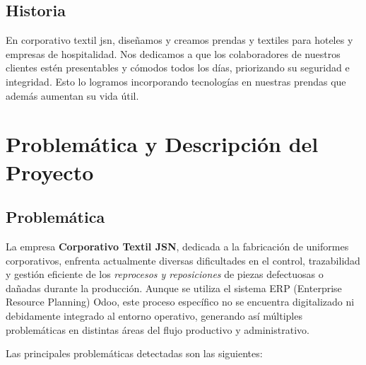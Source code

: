 \documentclass[12pt,letterpaper,spanish]{report}
\begin{document}
\section{Historia}
En corporativo textil jsn, diseñamos y creamos prendas y textiles para hoteles y empresas de hospitalidad.
Nos dedicamos a que los colaboradores de nuestros clientes estén presentables y cómodos todos los días, priorizando su seguridad e integridad.
Esto lo logramos incorporando tecnologías en nuestras prendas que además aumentan su vida útil.


\newpage




\chapter{Problemática y Descripción del Proyecto}
\newpage

\section{Problemática}

La empresa \textbf{Corporativo Textil JSN}, dedicada a la fabricación de uniformes corporativos, enfrenta actualmente diversas dificultades en el control, trazabilidad y gestión eficiente de los \textit{reprocesos y reposiciones} de piezas defectuosas o dañadas durante la producción. Aunque se utiliza el sistema ERP (Enterprise Resource Planning) Odoo, este proceso específico no se encuentra digitalizado ni debidamente integrado al entorno operativo, generando así múltiples problemáticas en distintas áreas del flujo productivo y administrativo.

Las principales problemáticas detectadas son las siguientes:
\end{document}
